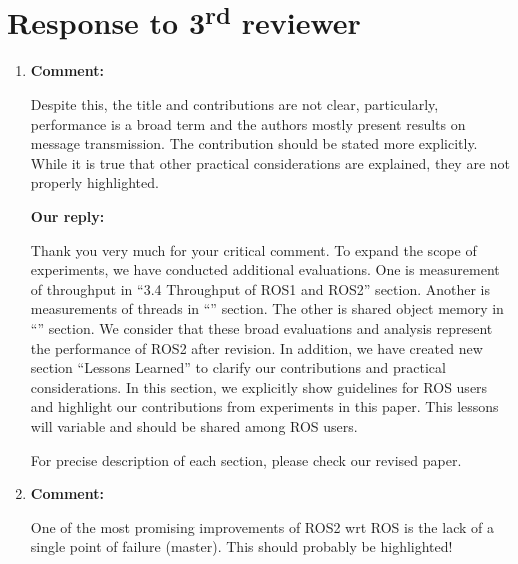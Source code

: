 \documentclass{article}
\newcommand\rd{\textsuperscript{rd}\xspace}
\begin{document}
\newpage

\section{Response to 3\rd reviewer}
\begin{enumerate}

\item \begin{flushleft}
  \textbf{Comment:}
\end{flushleft}
  Despite this, the title and contributions are not clear, particularly, performance is a broad term and the authors mostly present results on message transmission. 
  The contribution should be stated more explicitly.
  While it is true that other practical considerations are explained, they are not properly highlighted.

  \begin{flushleft}
    \textbf{Our reply:}
  \end{flushleft}
  Thank you very much for your critical comment.
  To expand the scope of experiments, we have conducted additional evaluations.
  One is measurement of throughput in ``3.4 Throughput of ROS1 and ROS2'' section.
  Another is measurements of threads in ``'' section.
  The other is shared object memory in ``'' section.
  We consider that these broad evaluations and analysis represent the performance of ROS2 after revision.
  In addition, we have created new section ``Lessons Learned'' to clarify our contributions and practical considerations.
  In this section, we explicitly show guidelines for ROS users and highlight our contributions from experiments in this paper.
  This lessons will variable and should be shared among ROS users.
  
  For precise description of each section, please check our revised paper.
  
\item \begin{flushleft}
  \textbf{Comment:}
\end{flushleft}
  One of the most promising improvements of ROS2 wrt ROS is the lack of a single point of failure (master). This should probably be highlighted!


\end{enumerate}
\end{document}
